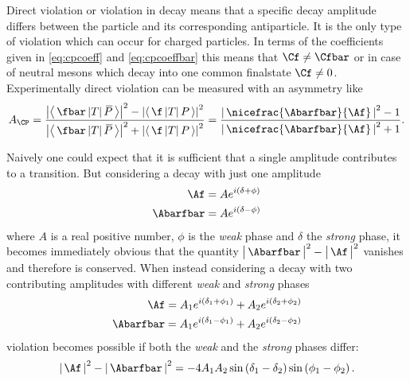Direct \CP violation or \CP violation in decay means that a specific decay amplitude differs between the particle and its corresponding antiparticle.
It is the only type of \CP violation which can occur for charged particles.
In terms of the \CP coefficients given in \cref{eq:cpcoeff} and \cref{eq:cpcoeffbar} this means that $\Cf\neq\Cfbar$ or in case of neutral mesons which decay into one common finalstate $\Cf\neq0$.
Experimentally direct \CP violation can be measured with an asymmetry like
\begin{equation}
A_{\CP}=\frac{\left|\left<\,\fbar\,|T|\,\kern 0.18em\overline{\kern -0.18em P}\,\right>\right|^2-\left|\left<\,\f\,|T|\,P\,\right>\right|^2}{\left|\left<\,\fbar\,|T|\,\kern 0.18em\overline{\kern -0.18em P}\,\right>\right|^2+\left|\left<\,\f\,|T|\,P\,\right>\right|^2} = \frac{\left|\,\nicefrac{\Abarfbar}{\Af}\,\right|^2-1}{\left|\,\nicefrac{\Abarfbar}{\Af}\,\right|^2+1}.
\end{equation}

Naively one could expect that it is sufficient that a single amplitude contributes to a transition.
But considering a decay with just one amplitude
\begin{equation}
\begin{split}
\Af&=Ae^{i\left(\delta+\phi\right)}\\
\Abarfbar&=Ae^{i\left(\delta-\phi\right)}
\end{split}
\end{equation}
where $A$ is a real positive number, $\phi$ is the \emph{weak} phase and $\delta$ the \emph{strong} phase, it becomes immediately obvious that the quantity $\big|\,\Abarfbar\,\big|^2-\big|\,\Af\,\big|^2$ vanishes and therefore \CP is conserved.
When instead considering a decay with two contributing amplitudes with different \emph{weak} and \emph{strong} phases
\begin{equation}
\begin{split}
\Af=A_1e^{i\left(\delta_1+\phi_1\right)}+A_2e^{i\left(\delta_2+\phi_2\right)}\\
\Abarfbar=A_1e^{i\left(\delta_1-\phi_1\right)}+A_2e^{i\left(\delta_2-\phi_2\right)}
\end{split}
\end{equation}
\CP violation becomes possible if both the \emph{weak} and the \emph{strong} phases differ:
\begin{equation}
\left|\,\Af\,\right|^2-\left|\,\Abarfbar\,\right|^2=-4A_1A_2\sin\left(\delta_1-\delta_2\right)\sin\left(\phi_1-\phi_2\right).
\end{equation}

